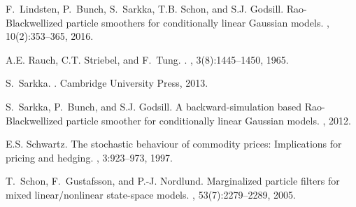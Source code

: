 \documentclass[nolayout]{article}
\theoremstyle{plain}
\theoremstyle{definition}
\newcommand{\1}{\mathbbm{1}}
\begin{document}
\begin{thebibliography}{FGDW02}
F.~Lindsten, P.~Bunch, S.~Sarkka, T.B. Schon, and S.J. Godsill.
\newblock Rao-{B}lackwellized particle smoothers for conditionally linear
  {G}aussian models.
,
  10(2):353--365, 2016.

A.E. Rauch, C.T. Striebel, and F.~Tung.
.
,
  3(8):1445--1450, 1965.

S.~Sarkka.
.
\newblock Cambridge {U}niversity {P}ress, 2013.

S.~Sarkka, P.~Bunch, and S.J. Godsill.
\newblock A backward-simulation based {R}ao-{B}lackwellized particle smoother
  for conditionally linear {G}aussian models.
, 2012.

E.S. Schwartz.
\newblock The stochastic behaviour of commodity prices: Implications for
  pricing and hedging.
, 3:923--973, 1997.

T.~Schon, F.~Gustafsson, and P.-J. Nordlund.
\newblock Marginalized particle filters for mixed linear/nonlinear state-space
  models.
, 53(7):2279--2289,
  2005.

\end{thebibliography}


%
\end{document}
